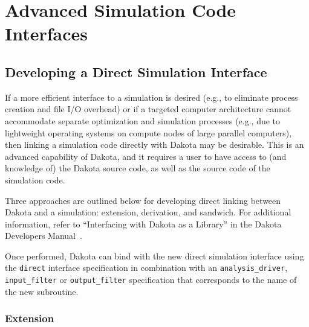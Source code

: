 \chapter{Advanced Simulation Code Interfaces}\label{advint}


\section{Developing a Direct Simulation Interface}\label{advint:direct}

If a more efficient interface to a simulation is desired (e.g., to
eliminate process creation and file I/O overhead) or if a targeted
computer architecture cannot accommodate separate optimization and
simulation processes (e.g., due to lightweight operating systems on
compute nodes of large parallel computers), then linking a simulation
code directly with Dakota may be desirable. This is an advanced
capability of Dakota, and it requires a user to have access to (and
knowledge of) the Dakota source code, as well as the source code of
the simulation code.

Three approaches are outlined below for developing direct linking
between Dakota and a simulation: extension, derivation, and
sandwich. For additional information, refer to ``Interfacing with
Dakota as a Library'' in the Dakota Developers Manual~\cite{DevMan}.

Once performed, Dakota can bind with the new direct simulation
interface using the \texttt{direct} interface specification in
combination with an \texttt{analysis\_driver}, \texttt{input\_filter}
or \texttt{output\_filter} specification that corresponds to the name
of the new subroutine.

\subsection{Extension}\label{advint:direct:extension}


